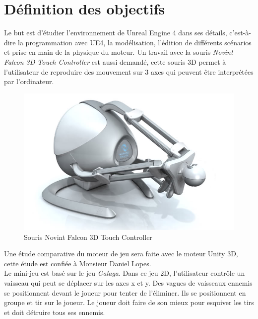 \documentclass[11pt, a4paper, oneside]{article}
\begin{document}
\section{Définition des objectifs}
Le but est d'étudier l'environnement de Unreal Engine 4 dans ses détails, c'est-à-dire la programmation avec UE4, la modélisation, l'édition de différents scénarios et prise en main de la physique du moteur. Un travail avec la souris \textit{Novint Falcon 3D Touch Controller} est aussi demandé, cette souris 3D permet à l'utilisateur de reproduire des mouvement sur 3 axes qui peuvent être interprétées par l'ordinateur.

\begin{figure}[h]
	\begin{center}
	\includegraphics[scale=.4]{falcon}
	\caption{Souris Novint Falcon 3D Touch Controller}
	\end{center}
\end{figure}

Une étude comparative du moteur de jeu sera faite avec le moteur Unity 3D, cette étude est confiée à Monsieur Daniel Lopes.\\[0.3cm]
Le mini-jeu est basé sur le jeu \textit{Galaga}. Dans ce jeu 2D, l'utilisateur contrôle un vaisseau qui peut se déplacer sur les axes x et y. Des vagues de vaisseaux ennemis se positionnent devant le joueur pour tenter de l'éliminer. Ils se positionnent en groupe et tir sur le joueur. Le joueur doit faire de son mieux pour esquiver les tirs et doit détruire tous ses ennemis.
\end{document}
